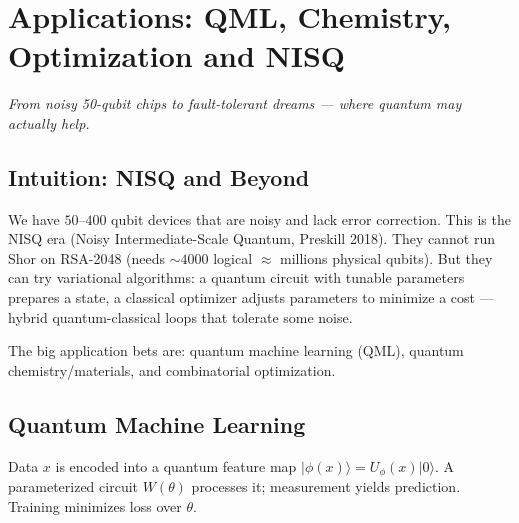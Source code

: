\chapter{Applications: QML, Chemistry, Optimization and NISQ}\label{ch:applications}
\begin{center}\small\textit{From noisy 50-qubit chips to fault-tolerant dreams --- where quantum may actually help.}\end{center}

\section{Intuition: NISQ and Beyond}
We have $50$--$400$ qubit devices that are noisy and lack error correction. This is the NISQ era (Noisy Intermediate-Scale Quantum, Preskill 2018). They cannot run Shor on RSA-2048 (needs $\sim4000$ logical $\approx$ millions physical qubits). But they can try variational algorithms: a quantum circuit with tunable parameters prepares a state, a classical optimizer adjusts parameters to minimize a cost --- hybrid quantum-classical loops that tolerate some noise.

The big application bets are: quantum machine learning (QML), quantum chemistry/materials, and combinatorial optimization.

\section{Quantum Machine Learning}
Data $x$ is encoded into a quantum feature map $\lvert\phi(x)\rangle=U_{\phi}(x)\lvert0\rangle$. A parameterized circuit $W(\theta)$ processes it; measurement yields prediction. Training minimizes loss over $\theta$.

\begin{center}
\end{center}

